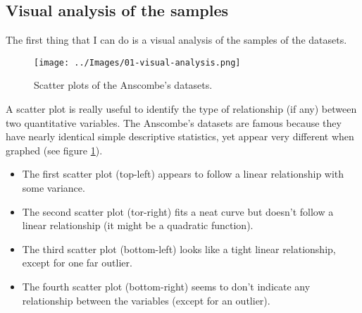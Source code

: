     \subsection{Visual analysis of the samples}
        The first thing that I can do is a visual analysis of the samples of the datasets.
        \begin{figure}
            \centering
            \texttt{[image: ../Images/01-visual-analysis.png]}
            \caption{Scatter plots of the Anscombe's datasets.}
            \label{visual-analysis}
        \end{figure}
        A scatter plot is really useful to identify the type of relationship (if any) between two quantitative variables. The Anscombe's datasets are famous because they have nearly identical simple descriptive statistics, yet appear very different when graphed (see figure \ref{visual-analysis}).
        \begin{itemize}
            \item The first scatter plot (top-left) appears to follow a linear relationship with some variance.
            \item The second scatter plot (tor-right) fits a neat curve but doesn't follow a linear relationship (it might be a quadratic function).
            \item The third scatter plot (bottom-left) looks like a tight linear relationship, except for one far outlier.
            \item The fourth scatter plot (bottom-right) seems to don't indicate any relationship between the variables (except for an outlier).
        \end{itemize}
